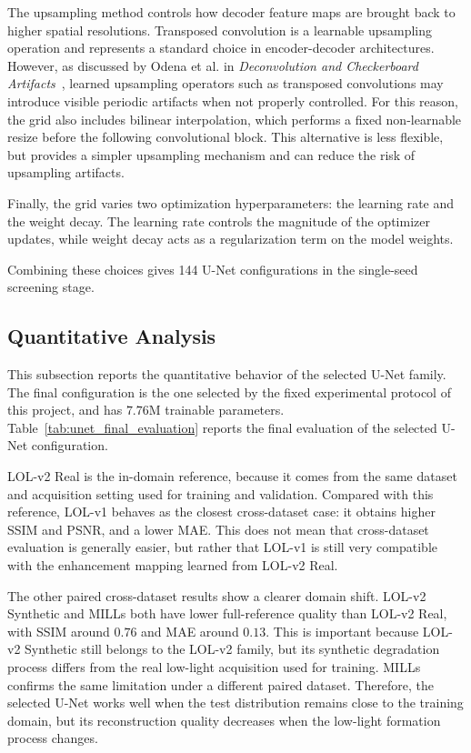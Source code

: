 The upsampling method controls how decoder feature maps are brought back to higher spatial resolutions. Transposed convolution is a learnable upsampling operation and represents a standard choice in encoder-decoder architectures. However, as discussed by Odena et al. in \emph{Deconvolution and Checkerboard Artifacts}~\cite{odena2016deconvolution}, learned upsampling operators such as transposed convolutions may introduce visible periodic artifacts when not properly controlled. For this reason, the grid also includes bilinear interpolation, which performs a fixed non-learnable resize before the following convolutional block. This alternative is less flexible, but provides a simpler upsampling mechanism and can reduce the risk of upsampling artifacts.

Finally, the grid varies two optimization hyperparameters: the learning rate and the weight decay. The learning rate controls the magnitude of the optimizer updates, while weight decay acts as a regularization term on the model weights.

Combining these choices gives 144 U-Net configurations in the single-seed screening stage.

\subsection{Quantitative Analysis}

This subsection reports the quantitative behavior of the selected U-Net family. The final configuration is the one selected by the fixed experimental protocol of this project, and has $7.76$M trainable parameters. Table~\ref{tab:unet_final_evaluation} reports the final evaluation of the selected U-Net configuration.



LOL-v2 Real is the in-domain reference, because it comes from the same dataset and acquisition setting used for training and validation. Compared with this reference, LOL-v1 behaves as the closest cross-dataset case: it obtains higher SSIM and PSNR, and a lower MAE. This does not mean that cross-dataset evaluation is generally easier, but rather that LOL-v1 is still very compatible with the enhancement mapping learned from LOL-v2 Real.

The other paired cross-dataset results show a clearer domain shift. LOL-v2 Synthetic and MILLs both have lower full-reference quality than LOL-v2 Real, with SSIM around $0.76$ and MAE around $0.13$. This is important because LOL-v2 Synthetic still belongs to the LOL-v2 family, but its synthetic degradation process differs from the real low-light acquisition used for training. MILLs confirms the same limitation under a different paired dataset. Therefore, the selected U-Net works well when the test distribution remains close to the training domain, but its reconstruction quality decreases when the low-light formation process changes.

